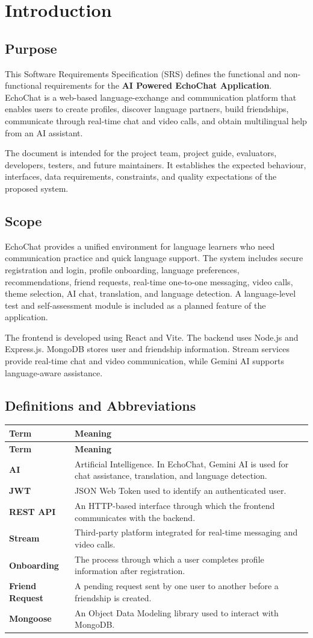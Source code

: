 \documentclass[12pt,a4paper]{report}
\newcommand{\term}[2]{\textbf{#1} & #2 \\ \hline}
\begin{document}
\chapter{Introduction}
\section{Purpose}
This Software Requirements Specification (SRS) defines the functional and non-functional requirements for the \textbf{AI Powered EchoChat Application}. EchoChat is a web-based language-exchange and communication platform that enables users to create profiles, discover language partners, build friendships, communicate through real-time chat and video calls, and obtain multilingual help from an AI assistant.

The document is intended for the project team, project guide, evaluators, developers, testers, and future maintainers. It establishes the expected behaviour, interfaces, data requirements, constraints, and quality expectations of the proposed system.

\section{Scope}
EchoChat provides a unified environment for language learners who need communication practice and quick language support. The system includes secure registration and login, profile onboarding, language preferences, recommendations, friend requests, real-time one-to-one messaging, video calls, theme selection, AI chat, translation, and language detection. A language-level test and self-assessment module is included as a planned feature of the application.

The frontend is developed using React and Vite. The backend uses Node.js and Express.js. MongoDB stores user and friendship information. Stream services provide real-time chat and video communication, while Gemini AI supports language-aware assistance.

\section{Definitions and Abbreviations}
\renewcommand{\arraystretch}{1.35}
\begin{longtable}{|p{1.6in}|p{4.7in}|}
\hline
\rowcolor{gray!25}\textbf{Term} & \textbf{Meaning} \\ \hline
\endfirsthead
\hline
\rowcolor{gray!25}\textbf{Term} & \textbf{Meaning} \\ \hline
\endhead
\term{AI}{Artificial Intelligence. In EchoChat, Gemini AI is used for chat assistance, translation, and language detection.}
\term{JWT}{JSON Web Token used to identify an authenticated user.}
\term{REST API}{An HTTP-based interface through which the frontend communicates with the backend.}
\term{Stream}{Third-party platform integrated for real-time messaging and video calls.}
\term{Onboarding}{The process through which a user completes profile information after registration.}
\term{Friend Request}{A pending request sent by one user to another before a friendship is created.}
\term{Mongoose}{An Object Data Modeling library used to interact with MongoDB.}
\end{longtable}
\end{document}
